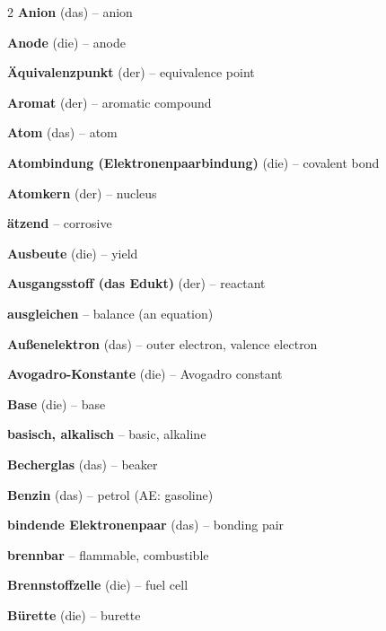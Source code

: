 \begin{multicols}{2}
\textbf{Anion} (das) -- anion\dotfill\hyperref[e:95]{\pageref*{e:95}}\par
\textbf{Anode} (die) -- anode\dotfill\hyperref[e:198]{\pageref*{e:198}}\par
\textbf{Äquivalenzpunkt} (der) -- equivalence point\dotfill\hyperref[e:175]{\pageref*{e:175}}\par
\textbf{Aromat} (der) -- aromatic compound\dotfill\hyperref[e:217]{\pageref*{e:217}}\par
\textbf{Atom} (das) -- atom\dotfill\hyperref[e:72]{\pageref*{e:72}}\par
\textbf{Atombindung (Elektronenpaarbindung)} (die) -- covalent bond\dotfill\hyperref[e:109]{\pageref*{e:109}}\par
\textbf{Atomkern} (der) -- nucleus\dotfill\hyperref[e:73]{\pageref*{e:73}}\par
\textbf{ätzend} -- corrosive\dotfill\hyperref[e:172]{\pageref*{e:172}}\par
\textbf{Ausbeute} (die) -- yield\dotfill\hyperref[e:150]{\pageref*{e:150}}\par
\textbf{Ausgangsstoff (das Edukt)} (der) -- reactant\dotfill\hyperref[e:126]{\pageref*{e:126}}\par
\textbf{ausgleichen} -- balance (an equation)\dotfill\hyperref[e:130]{\pageref*{e:130}}\par
\textbf{Außenelektron} (das) -- outer electron, valence electron\dotfill\hyperref[e:78]{\pageref*{e:78}}\par
\textbf{Avogadro-Konstante} (die) -- Avogadro constant\dotfill\hyperref[e:250]{\pageref*{e:250}}\par

\par\nopagebreak
\textbf{Base} (die) -- base\dotfill\hyperref[e:153]{\pageref*{e:153}}\par
\textbf{basisch, alkalisch} -- basic, alkaline\dotfill\hyperref[e:157]{\pageref*{e:157}}\par
\textbf{Becherglas} (das) -- beaker\dotfill\hyperref[e:40]{\pageref*{e:40}}\par
\textbf{Benzin} (das) -- petrol (AE: gasoline)\dotfill\hyperref[e:235]{\pageref*{e:235}}\par
\textbf{bindende Elektronenpaar} (das) -- bonding pair\dotfill\hyperref[e:110]{\pageref*{e:110}}\par
\textbf{brennbar} -- flammable, combustible\dotfill\hyperref[e:28]{\pageref*{e:28}}\par
\textbf{Brennstoffzelle} (die) -- fuel cell\dotfill\hyperref[e:203]{\pageref*{e:203}}\par
\textbf{Bürette} (die) -- burette\dotfill\hyperref[e:51]{\pageref*{e:51}}\par


\end{multicols}
